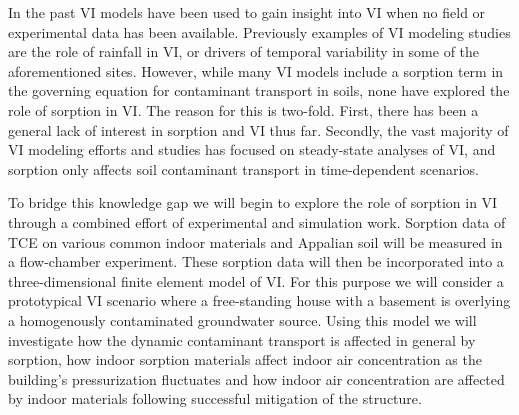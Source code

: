 
In the past VI models have been used to gain insight into VI when no field or experimental data has been available.
Previously examples of VI modeling studies are the role of rainfall in VI\cite{shen_numerical_2012}, or drivers of temporal variability in some of the aforementioned sites\cite{strom_factors_2019}.
However, while many VI models include a sorption term in the governing equation for contaminant transport in soils, none have explored the role of sorption in VI.
The reason for this is two-fold.
First, there has been a general lack of interest in sorption and VI thus far.
Secondly, the vast majority of VI modeling efforts and studies has focused on steady-state analyses of VI, and sorption only affects soil contaminant transport in time-dependent scenarios.\par

To bridge this knowledge gap we will begin to explore the role of sorption in VI through a combined effort of experimental and simulation work.
Sorption data of TCE on various common indoor materials and Appalian soil will be measured in a flow-chamber experiment. %
These sorption data will then be incorporated into a three-dimensional finite element model of VI.
For this purpose we will consider a prototypical VI scenario where a free-standing house with a basement is overlying a homogenously contaminated groundwater source.
Using this model we will investigate how the dynamic contaminant transport is affected in general by sorption, how indoor sorption materials affect indoor air concentration as the building's pressurization fluctuates and how indoor air concentration are affected by indoor materials following successful mitigation of the structure.
